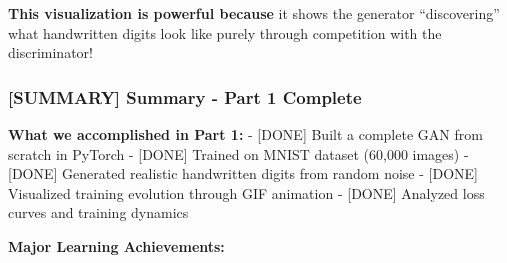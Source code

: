 \documentclass[11pt]{article}
\begin{document}
\textbf{This visualization is powerful because} it shows the generator
``discovering'' what handwritten digits look like purely through
competition with the discriminator!

    \subsubsection{{[}SUMMARY{]} Summary - Part 1
Complete}\label{summary-summary---part-1-complete}

\textbf{What we accomplished in Part 1:} - {[}DONE{]} Built a complete
GAN from scratch in PyTorch - {[}DONE{]} Trained on MNIST dataset
(60,000 images) - {[}DONE{]} Generated realistic handwritten digits from
random noise - {[}DONE{]} Visualized training evolution through GIF
animation - {[}DONE{]} Analyzed loss curves and training dynamics

\textbf{Major Learning Achievements:}
\end{document}
